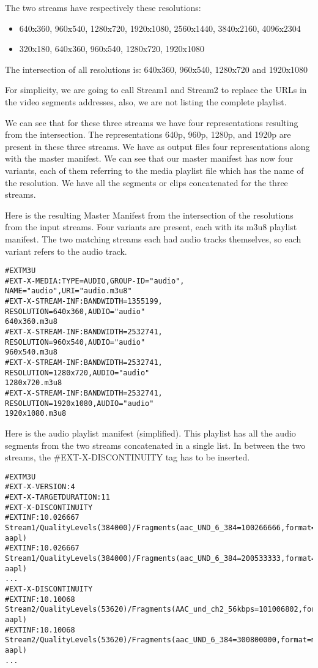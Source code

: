 The two streams have respectively these resolutions: 

\begin{itemize}
\item 640x360, 960x540, 1280x720, 1920x1080, 2560x1440, 3840x2160, 4096x2304
\item 320x180, 640x360, 960x540, 1280x720, 1920x1080
\end{itemize}

The intersection of all resolutions is: 640x360, 960x540, 1280x720 and 1920x1080

For simplicity, we are going to call Stream1 and Stream2 to replace the URLs in the video segments addresses, also, we are not listing the complete playlist.

We can see that for these three streams we have four representations resulting from the intersection. The representations 640p, 960p, 1280p, and 1920p are present in these three streams. We have as output files four representations along with the master manifest. We can see that our master manifest has now four variants, each of them referring to the media playlist file which has the name of the resolution. We have all the segments or clips concatenated for the three streams.

Here is the resulting Master Manifest from the intersection of the resolutions from the input streams. Four variants are present, each with its m3u8 playlist manifest. The two matching streams each had audio tracks themselves, so each variant refers to the audio track.

\begin{lstlisting}
#EXTM3U
#EXT-X-MEDIA:TYPE=AUDIO,GROUP-ID="audio",
NAME="audio",URI="audio.m3u8"
#EXT-X-STREAM-INF:BANDWIDTH=1355199,
RESOLUTION=640x360,AUDIO="audio"
640x360.m3u8
#EXT-X-STREAM-INF:BANDWIDTH=2532741,
RESOLUTION=960x540,AUDIO="audio"
960x540.m3u8
#EXT-X-STREAM-INF:BANDWIDTH=2532741,
RESOLUTION=1280x720,AUDIO="audio"
1280x720.m3u8
#EXT-X-STREAM-INF:BANDWIDTH=2532741,
RESOLUTION=1920x1080,AUDIO="audio"
1920x1080.m3u8
\end{lstlisting}

Here is the audio playlist manifest (simplified). This playlist has all the audio segments from the two streams concatenated in a single list. In between the two streams, the \#EXT-X-DISCONTINUITY tag has to be inserted.

\begin{lstlisting}
#EXTM3U
#EXT-X-VERSION:4
#EXT-X-TARGETDURATION:11
#EXT-X-DISCONTINUITY
#EXTINF:10.026667
Stream1/QualityLevels(384000)/Fragments(aac_UND_6_384=100266666,format=m3u8-aapl)
#EXTINF:10.026667
Stream1/QualityLevels(384000)/Fragments(aac_UND_6_384=200533333,format=m3u8-aapl)
...
#EXT-X-DISCONTINUITY
#EXTINF:10.10068
Stream2/QualityLevels(53620)/Fragments(AAC_und_ch2_56kbps=101006802,format=m3u8-aapl)
#EXTINF:10.10068
Stream2/QualityLevels(53620)/Fragments(aac_UND_6_384=300800000,format=m3u8-aapl)
...
\end{lstlisting}

